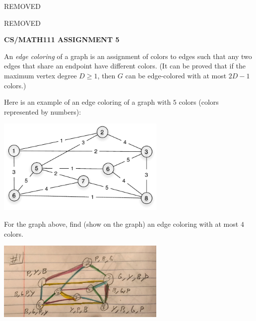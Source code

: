 \documentclass{article}
\begin{document}
\centerline{REMOVED}
\centerline{REMOVED}
\centerline{\large \bf CS/MATH111 ASSIGNMENT 5}


\vskip 0.15in


\vskip 0.15in




\begin{problem}
An \emph{edge coloring} of a graph is an
assignment of colors to edges such that any two
edges that share an endpoint have different colors. (It can be proved that if the maximum vertex degree $D \ge 1$, then $G$ can be edge-colored with at most $2D - 1$ colors.)

Here is an example of an edge coloring of
a graph with $5$ colors (colors represented by numbers):

\begin{center}
\includegraphics[width=3.2in]{HW5_pics/graph_edge_color_hw5.pdf}
\end{center}

\noindent
For the graph above, find (show on the graph) an edge coloring with at most $4$ colors.



\end{problem}

\begin{solution}

\begin{center}
\includegraphics[width=3.2in]{HW5_pics/g2.png}
\end{center}

\end{solution}
\end{document}

